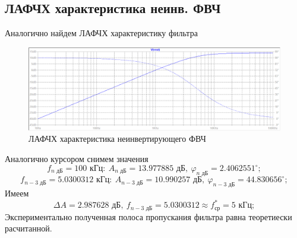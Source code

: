 \documentclass[a4paper, 12pt]{article}
\begin{document}
    \subsection{ЛАФЧХ характеристика неинв. ФВЧ}
    Аналогично найдем ЛАФЧХ характеристику фильтра
    \begin{figure}[H]
        \centering
        \includegraphics[scale=0.46]{2task_lapfr.png}
        \captionsetup{skip=0pt}
        \caption{ЛАФЧХ характеристика неинвертирующего ФВЧ}
        \label{fig:2task_lapfr}
    \end{figure}
    \noindent Аналогично курсором снимем значения
    $$
    f_{n\text{ дБ}}=100\text{ кГц}:\ A_{n\text{ дБ}}=13.977885\text{ дБ},\ \varphi_{n\text{ дБ}}=2.4062551^{\circ};
    $$
    $$
    f_{n-3\text{ дБ}}=5.0300312 \text{ кГц}:\ A_{n-3\text{ дБ}}=10.990257\text{ дБ},\ \varphi_{n-3\text{ дБ}}=44.830656^{\circ};
    $$
    Имеем
    $$
    \Delta A=2.987628\text{ дБ},\ f_{n-3\text{ дБ}}=5.0300312\approx f_\text{ср}^*=5\text{ кГц};
    $$
    Экспериментально полученная полоса пропускания фильтра равна теоретиески расчитанной.
\end{document}

